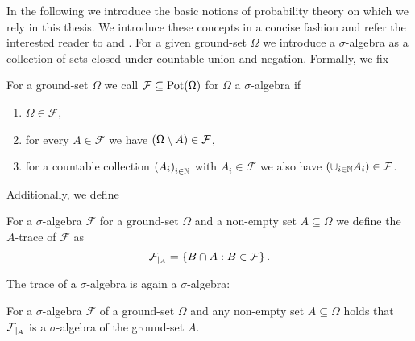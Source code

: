 In the following we introduce the basic notions of probability theory on which
we rely in this thesis. We introduce these concepts in a concise fashion and
refer the interested reader to \cite{Klenke} and \cite{Bauer}.
For a given ground-set $\Omega$ we introduce a $\sigma$-algebra as a collection
of sets closed under countable union and negation. Formally, we fix
\begin{definition}
  For a ground-set $\Omega$ we call $\mathcal{F}\subseteq\operatorname{Pot}(\Omega)$ for
  $\Omega$ a $\sigma$-algebra if
  \begin{enumerate}
    \item $\Omega\in\mathcal{F}$,
    \item for every $A\in\mathcal{F}$ we have $\left(\Omega\setminus A\right)
      \in\mathcal{F}$,
    \item for a countable collection $\left(A_{i}\right)_{i\in\mathbb{N}}$ with
      $A_{i}\in\mathcal{F}$ we also have $\left(\cup_{i\in\mathbb{N}}A_{i}\right)\in
      \mathcal{F}$.
  \end{enumerate}
\end{definition}
Additionally, we define
\begin{definition}[Trace]
  For a $\sigma$-algebra $\mathcal{F}$ for a ground-set $\Omega$ and a
  non-empty set $A\subseteq\Omega$ we define the $A$-trace of $\mathcal{F}$
  as
  \begin{equation*}
    {\mathcal{F}}_{|_{A}} = \left\{B\cap A:B\in\mathcal{F}\right\}.
  \end{equation*}
\end{definition}
The trace of a $\sigma$-algebra is again a $\sigma$-algebra:
\begin{lemma}
  \cite[Theorem 1.26]{Klenke}
  For a $\sigma$-algebra $\mathcal{F}$ of a ground-set $\Omega$ and any
  non-empty set $A\subseteq\Omega$ holds that ${\mathcal{F}}_{|_{A}}$ is
  a $\sigma$-algebra of the ground-set $A$.
  \label{lem:trace}
\end{lemma}

